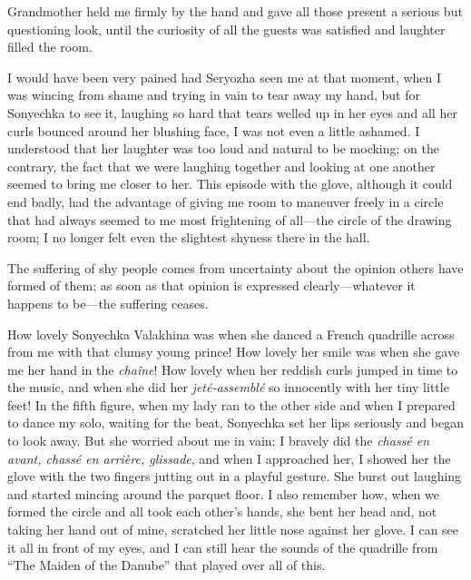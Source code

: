 Grandmother held me firmly by the hand and gave all those present a serious but questioning look, until the curiosity of all the guests was satisfied and laughter filled the room. 

I would have been very pained had Seryozha seen me at that moment, when I was wincing from shame and trying in vain to tear away my hand, but for Sonyechka to see it, laughing so hard that tears welled up in her eyes and all her curls bounced around her blushing face, I was not even a little ashamed. I understood that her laughter was too loud and natural to be mocking; on the contrary, the fact that we were laughing together and looking at one another seemed to bring me closer to her. This episode with the glove, although it could end badly, had the advantage of giving me room to maneuver freely in a circle that had always seemed to me most frightening of all---the circle of the drawing room; I no longer felt even the slightest shyness there in the hall.

The suffering of shy people comes from uncertainty about the opinion others have formed of them; as soon as that opinion is expressed clearly---whatever it happens to be---the suffering ceases.

How lovely Sonyechka Valakhina was when she danced a French quadrille across from me with that clumsy young prince! How lovely her smile was when she gave me her hand in the \textit{cha\^ine}! How lovely when her reddish curls jumped in time to the music, and when she did her \textit{jet\'e-assembl\'e} so innocently with her tiny little feet! In the fifth figure, when my lady ran to the other side and when I prepared to dance my solo, waiting for the beat, Sonyechka set her lips seriously and began to look away. But she worried about me in vain: I bravely did the \textit{chass\'e en avant, chass\'e en arri\`ere, glissade}, and when I approached her, I showed her the glove with the two fingers jutting out in a playful gesture. She burst out laughing and started mincing around the parquet floor. I also remember how, when we formed the circle and all took each other's hands, she bent her head and, not taking her hand out of mine, scratched her little nose against her glove. I can see it all in front of my eyes, and I can still hear the sounds of the quadrille from ``The Maiden of the Danube'' that played over all of this.

